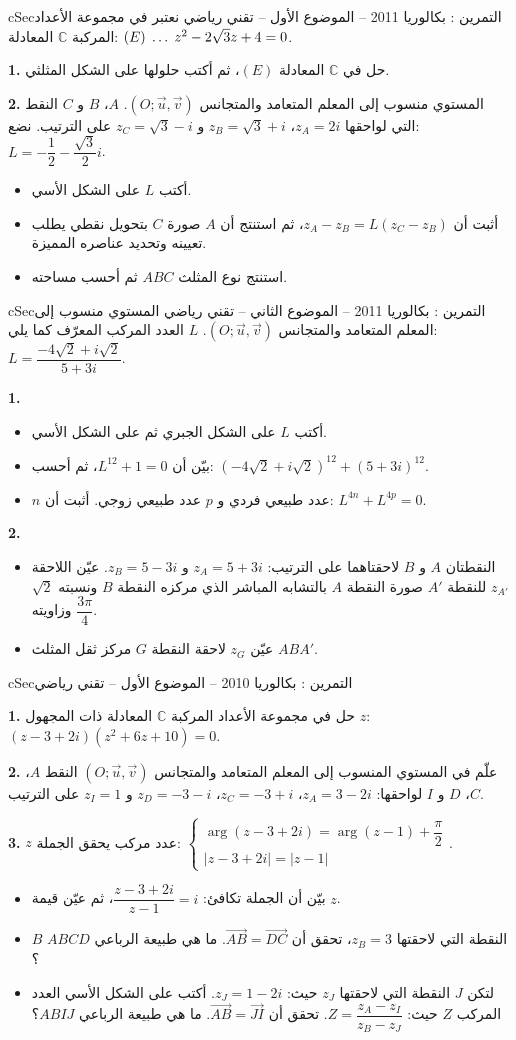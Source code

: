 \documentclass[12pt,a4paper]{article}
\newenvironment{BOX}[2]{\begin{otherlanguage}{english}\begin{arbox}{#1}{#2}}{\end{arbox}\end{otherlanguage}}
\newcounter{exo}
\newenvironment{tamrin}[1]{\stepcounter{exo}\begin{BOX}{cSec}{التمرين \theexo: #1}}{\end{BOX}}
\renewcommand{\ldots}{\mathinner{\ldotp\ldotp\ldotp}}
\newenvironment{sq}{\begin{itemize}[leftmargin=2.4em,itemsep=3pt]}{\end{itemize}}
\newcommand{\qa}{\item[(أ)]}\newcommand{\qb}{\item[(ب)]}\newcommand{\qc}{\item[(جـ)]}\newcommand{\qd}{\item[(د)]}\newcommand{\qe}{\item[(هـ)]}
\newcommand{\QQ}[1]{\par\smallskip\textbf{#1.} }
\begin{document}
\begin{tamrin}{بكالوريا 2011 -- الموضوع الأول -- تقني رياضي}
نعتبر في مجموعة الأعداد المركبة $\mathbb{C}$ المعادلة: \quad $(E)\;\ldots\;z^2-2\sqrt3z+4=0$.
\QQ{1} حل في $\mathbb{C}$ المعادلة $(E)$، ثم أكتب حلولها على الشكل المثلثي.
\QQ{2} المستوي منسوب إلى المعلم المتعامد والمتجانس $(O;\vec u,\vec v)$.
$A$، $B$ و $C$ النقط التي لواحقها $z_A=2i$، $z_B=\sqrt3+i$ و $z_C=\sqrt3-i$ على الترتيب. نضع: $L=-\dfrac12-\dfrac{\sqrt3}{2}i$.
\begin{sq}
\qa أكتب $L$ على الشكل الأسي.
\qb أثبت أن $z_A-z_B=L(z_C-z_B)$، ثم استنتج أن $A$ صورة $C$ بتحويل نقطي يطلب تعيينه وتحديد عناصره المميزة.
\qc استنتج نوع المثلث $ABC$ ثم أحسب مساحته.
\end{sq}
\end{tamrin}

\begin{tamrin}{بكالوريا 2011 -- الموضوع الثاني -- تقني رياضي}
المستوي منسوب إلى المعلم المتعامد والمتجانس $(O;\vec u,\vec v)$. $L$ العدد المركب المعرّف كما يلي: $L=\dfrac{-4\sqrt2+i\sqrt2}{5+3i}$.
\QQ{1}
\begin{sq}
\qa أكتب $L$ على الشكل الجبري ثم على الشكل الأسي.
\qb بيّن أن $L^{12}+1=0$، ثم أحسب: $(-4\sqrt2+i\sqrt2)^{12}+(5+3i)^{12}$.
\qc $n$ عدد طبيعي فردي و $p$ عدد طبيعي زوجي. أثبت أن: $L^{4n}+L^{4p}=0$.
\end{sq}
\QQ{2}
\begin{sq}
\qa النقطتان $A$ و $B$ لاحقتاهما على الترتيب: $z_A=5+3i$ و $z_B=5-3i$.
عيّن اللاحقة $z_{A'}$ للنقطة $A'$ صورة النقطة $A$ بالتشابه المباشر الذي مركزه النقطة $B$ ونسبته $\sqrt2$ وزاويته $\dfrac{3\pi}{4}$.
\qb عيّن $z_G$ لاحقة النقطة $G$ مركز ثقل المثلث $ABA'$.
\end{sq}
\end{tamrin}

\begin{tamrin}{بكالوريا 2010 -- الموضوع الأول -- تقني رياضي}
\QQ{1} حل في مجموعة الأعداد المركبة $\mathbb{C}$ المعادلة ذات المجهول $z$: $(z-3+2i)(z^2+6z+10)=0$.
\QQ{2} علّم في المستوي المنسوب إلى المعلم المتعامد والمتجانس $(O;\vec u,\vec v)$ النقط $A$، $C$، $D$ و $I$ لواحقها:
$z_A=3-2i$، $z_C=-3+i$، $z_D=-3-i$ و $z_I=1$ على الترتيب.
\QQ{3} $z$ عدد مركب يحقق الجملة: $\begin{cases}\arg(z-3+2i)=\arg(z-1)+\dfrac{\pi}{2}\\[4pt] |z-3+2i|=|z-1|\end{cases}$.
\begin{sq}
\qa بيّن أن الجملة تكافئ: $\dfrac{z-3+2i}{z-1}=i$، ثم عيّن قيمة $z$.
\qb $B$ النقطة التي لاحقتها $z_B=3$، تحقق أن $\overrightarrow{AB}=\overrightarrow{DC}$. ما هي طبيعة الرباعي $ABCD$؟
\qc لتكن $J$ النقطة التي لاحقتها $z_J$ حيث: $z_J=1-2i$.
أكتب على الشكل الأسي العدد المركب $Z$ حيث: $Z=\dfrac{z_A-z_I}{z_B-z_J}$.
تحقق أن $\overrightarrow{AB}=\overrightarrow{JI}$. ما هي طبيعة الرباعي $ABIJ$؟
\end{sq}
\end{tamrin}
\end{document}
